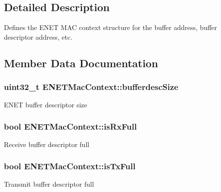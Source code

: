 \subsection{Detailed Description}
Defines the E\+N\+ET M\+AC context structure for the buffer address, buffer descriptor address, etc. 

\subsection{Member Data Documentation}
\subsubsection[{\texorpdfstring{bufferdesc\+Size}{bufferdescSize}}]{\setlength{\rightskip}{0pt plus 5cm}uint32\+\_\+t E\+N\+E\+T\+Mac\+Context\+::bufferdesc\+Size}\hypertarget{structENETMacContext_a7863bb1f5c2c1a2b4990732b603d4224}{}\label{structENETMacContext_a7863bb1f5c2c1a2b4990732b603d4224}
E\+N\+ET buffer descriptor size 
\subsubsection[{\texorpdfstring{is\+Rx\+Full}{isRxFull}}]{\setlength{\rightskip}{0pt plus 5cm}bool E\+N\+E\+T\+Mac\+Context\+::is\+Rx\+Full}\hypertarget{structENETMacContext_af7869528012536cd911b67b1f6e2228b}{}\label{structENETMacContext_af7869528012536cd911b67b1f6e2228b}
Receive buffer descriptor full 
\subsubsection[{\texorpdfstring{is\+Tx\+Full}{isTxFull}}]{\setlength{\rightskip}{0pt plus 5cm}bool E\+N\+E\+T\+Mac\+Context\+::is\+Tx\+Full}\hypertarget{structENETMacContext_a499f949b9364e7fec85acc5ad192c4ef}{}\label{structENETMacContext_a499f949b9364e7fec85acc5ad192c4ef}
Transmit buffer descriptor full 
